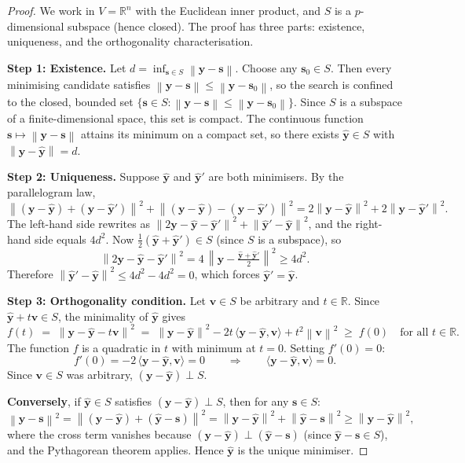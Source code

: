 \documentclass[11pt,a4paper]{article}
\theoremstyle{plain}
\theoremstyle{definition}
\newcommand{\R}{\mathbb{R}}
\newcommand{\yhat}{\hat{\bm{y}}}
\newcommand{\by}{\bm{y}}
\newcommand{\ip}[2]{\langle #1, #2 \rangle}
\newcommand{\norm}[1]{\left\lVert #1 \right\rVert}
\begin{document}
\begin{proof}
We work in $V = \R^n$ with the Euclidean inner product, and $S$ is a
$p$-dimensional subspace (hence closed).  The proof has three parts:
existence, uniqueness, and the orthogonality characterisation.

\medskip
\noindent\textbf{Step 1: Existence.}
Let $d = \inf_{\bm{s}\in S}\norm{\by - \bm{s}}$.
Choose any $\bm{s}_0 \in S$. Then every minimising candidate satisfies
$\norm{\by - \bm{s}} \le \norm{\by - \bm{s}_0}$,
so the search is confined to the closed, bounded set
$\{\bm{s}\in S : \norm{\by - \bm{s}} \le \norm{\by - \bm{s}_0}\}$.
Since $S$ is a subspace of a finite-dimensional space, this set is compact.
The continuous function $\bm{s}\mapsto\norm{\by - \bm{s}}$ attains its
minimum on a compact set, so there exists $\yhat\in S$ with
$\norm{\by - \yhat} = d$.

\medskip
\noindent\textbf{Step 2: Uniqueness.}
Suppose $\yhat$ and $\yhat'$ are both minimisers.
By the parallelogram law,
\[
  \norm{(\by - \yhat) + (\by - \yhat')}^2
  + \norm{(\by - \yhat) - (\by - \yhat')}^2
  = 2\norm{\by - \yhat}^2 + 2\norm{\by - \yhat'}^2.
\]
The left-hand side rewrites as
$\norm{2\by - \yhat - \yhat'}^2 + \norm{\yhat' - \yhat}^2$,
and the right-hand side equals $4d^2$.
Now $\frac{1}{2}(\yhat + \yhat') \in S$ (since $S$ is a subspace), so
\[
  \norm{2\by - \yhat - \yhat'}^2
  = 4\,\norm{\by - \tfrac{\yhat+\yhat'}{2}}^2
  \ge 4d^2.
\]
Therefore $\norm{\yhat' - \yhat}^2 \le 4d^2 - 4d^2 = 0$,
which forces $\yhat' = \yhat$.

\medskip
\noindent\textbf{Step 3: Orthogonality condition.}
Let $\bm{v}\in S$ be arbitrary and $t\in\R$.
Since $\yhat + t\bm{v}\in S$, the minimality of $\yhat$ gives
\[
  f(t)
  \;=\; \norm{\by - \yhat - t\bm{v}}^2
  \;=\; \norm{\by - \yhat}^2
        - 2t\,\ip{\by - \yhat}{\bm{v}}
        + t^2\norm{\bm{v}}^2
  \;\ge\; f(0)
  \quad\text{for all } t\in\R.
\]
The function $f$ is a quadratic in $t$ with minimum at $t=0$.
Setting $f'(0) = 0$:
\[
  f'(0) = -2\,\ip{\by-\yhat}{\bm{v}} = 0
  \qquad\Longrightarrow\qquad
  \ip{\by - \yhat}{\bm{v}} = 0.
\]
Since $\bm{v}\in S$ was arbitrary, $(\by - \yhat)\perp S$.

\medskip
\noindent\textbf{Conversely}, if $\yhat\in S$ satisfies $(\by-\yhat)\perp S$,
then for any $\bm{s}\in S$:
\[
  \norm{\by - \bm{s}}^2
  = \norm{(\by - \yhat) + (\yhat - \bm{s})}^2
  = \norm{\by - \yhat}^2 + \norm{\yhat - \bm{s}}^2
  \ge \norm{\by - \yhat}^2,
\]
where the cross term vanishes because $(\by - \yhat)\perp(\yhat-\bm{s})$
(since $\yhat - \bm{s}\in S$), and the Pythagorean theorem applies.
Hence $\yhat$ is the unique minimiser.
\end{proof}
\end{document}
